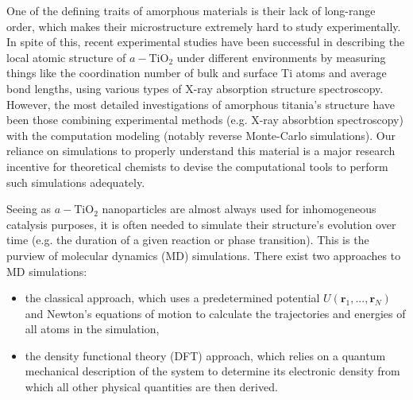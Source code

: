 \documentclass[aps,prb,twocolumn,amsmath,amssymb,superscriptaddress,longbibliography]{revtex4-1}
\newcommand\tab[1][1cm]{\hspace*{#1}} %
\begin{document}
\tab One of the defining traits of amorphous materials is their lack of long-range order, which makes their microstructure extremely hard to study experimentally.
In spite of this, recent experimental studies have been successful in describing the local atomic structure of $a-\text{TiO}_2$ under different environments\cite{exptl1,exptl2,exptl3} by measuring things like the coordination number of bulk and surface Ti atoms and average bond lengths, using various types of X-ray absorption structure spectroscopy.
However, the most detailed investigations of amorphous titania's structure have been those combining experimental methods (e.g. X-ray absorbtion spectroscopy) with the computation modeling (notably reverse Monte-Carlo simulations)\cite{comp_exptl1,comp_exptl2,comp_exptl3}.
Our reliance on simulations to properly understand this material is a major research incentive for theoretical chemists to devise the computational tools to perform such simulations adequately.

\tab Seeing as $a-\text{TiO}_2$ nanoparticles are almost always used for inhomogeneous catalysis purposes, it is often needed to simulate their structure's evolution over time (e.g. the duration of a given reaction or phase transition).
This is the purview of molecular dynamics (MD) simulations.
There exist two approaches to MD simulations:

\begin{itemize}
\item the classical approach, which uses a predetermined potential ${U(\textbf{r}_1,...,\textbf{r}_N)}$ and Newton's equations of motion to calculate the trajectories and energies of all atoms in the simulation,
\item the density functional theory (DFT) approach, which relies on a quantum mechanical description of the system to determine its electronic density from which all other physical quantities are then derived.
\end{itemize}
\end{document}
